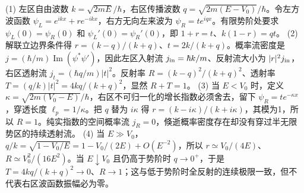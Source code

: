 (1) 左区自由波数 \(k=\sqrt{2mE}/\hbar\)，右区传播波数 \(q=\sqrt{2m(E-V_0)}/\hbar\)。令左方波函数 \(\psi_L=e^{ikx}+r e^{-ikx}\)，右方无向左来波为 \(\psi_R=t e^{iqx}\)。有限势阶处要求 \(\psi_L(0)=\psi_R(0)\) 和 \(\psi_L'(0)=\psi_R'(0)\)，即 \(1+r=t\)、\(k(1-r)=qt\)。
(2) 解联立边界条件得 \(r=(k-q)/(k+q)\)、\(t=2k/(k+q)\)。概率流密度是 \(j=(\hbar/m)\operatorname{Im}(\psi^*\psi')\)，因此左区入射流 \(j_{\rm in}=\hbar k/m\)、反射流大小为 \(|r|^2j_{\rm in}\)，右区透射流 \(j_t=(\hbar q/m)|t|^2\)。反射率 \(R=(k-q)^2/(k+q)^2\)、透射率 \(T=(q/k)|t|^2=4kq/(k+q)^2\)，显然 \(R+T=1\)。
(3) 当 \(E<V_0\) 时，定义 \(\kappa=\sqrt{2m(V_0-E)}/\hbar\)，右区不可归一化的增长指数必须舍去，留下 \(\psi_R=t e^{-\kappa x}\)，穿透长度 \(\ell_p=1/\kappa\)。把 \(q\) 替为 \(i\kappa\) 得 \(r=(k-i\kappa)/(k+i\kappa)\)，其模为1，所以 \(R=1\)。纯实指数的空间概率流 \(j_R=0\)，倏逝概率密度存在却没有穿过半无限势区的持续透射流。
(4) 当 \(E\gg V_0\)，\(q/k=\sqrt{1-V_0/E}=1-V_0/(2E)+O(E^{-2})\)，所以 \(r\simeq V_0/(4E)\)、\(R\simeq V_0^2/(16E^2)\)。当 \(E\downarrow V_0\) 且仍高于势阶时 \(q\to0^+\)，于是 \(T=4kq/(k+q)^2\to0\)、\(R\to1\)；这与低于势阶时全反射的连续极限一致，但不代表右区波函数振幅必为零。
